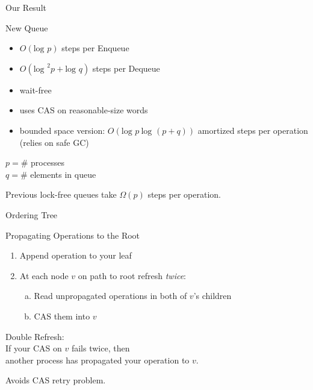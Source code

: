 \documentclass[compress]{beamer}
\newcommand{\op}[1]{\mbox{\sc #1}}
\renewcommand{\log}{\mbox{log }} %
\begin{document}
\begin{frame}{Our Result}

\begin{block}{New Queue}
\begin{itemize}
\item $O(\log p)$ steps per \op{Enqueue}
\item $O(\log^2 p + \log q)$ steps per \op{Dequeue}
\item wait-free
\item uses CAS on reasonable-size words
\item bounded space version: $O(\log p\ \log(p+q))$ amortized steps per operation
(relies on safe GC)
\end{itemize}
\end{block}

$p = \#$ processes\\
$q = \#$ elements in queue

\medskip

Previous lock-free queues take $\Omega(p)$ steps per operation.

\end{frame}

\begin{frame}{Ordering Tree}
\medskip

%
\only<2>{}%
\only<3>{}%

\end{frame}

\begin{frame}{Propagating Operations to the Root}

\begin{enumerate}
\item
Append operation to your leaf
\item
At each node $v$ on path to root refresh {\it twice}:
\begin{enumerate}[(a)]
\item
Read unpropagated operations in both of $v$'s children
\item
CAS them into $v$
\end{enumerate}
\end{enumerate}

\pause
\medskip

Double Refresh:\\
If your CAS on $v$ fails twice, then\\
another process has propagated your operation to $v$.

\pause
\medskip
Avoids CAS retry problem.
\end{frame}
\end{document}
